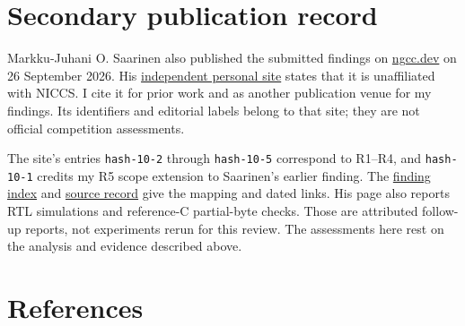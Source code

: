 \documentclass[
  english,
  11pt,
  a4paper,
]{article}
\begin{document}

\section{Secondary publication
record}\label{secondary-publication-record}

Markku-Juhani O. Saarinen also published the submitted findings on
\href{https://ngcc.dev/reports/hash-10.html}{ngcc.dev} on 26 September
2026. His \href{https://ngcc.dev/}{independent personal site} states
that it is unaffiliated with NICCS. I cite it for prior work and as
another publication venue for my findings. Its identifiers and editorial
labels belong to that site; they are not official competition
assessments.

The site's entries \texttt{hash-10-2} through \texttt{hash-10-5}
correspond to R1--R4, and \texttt{hash-10-1} credits my R5 scope
extension to Saarinen's earlier finding. The
\href{FINDINGS.md\#secondary-publication-record}{finding index} and
\href{data/saarinen_followup.json}{source record} give the mapping and
dated links. His page also reports RTL simulations and reference-C
partial-byte checks. Those are attributed follow-up reports, not
experiments rerun for this review. The assessments here rest on the
analysis and evidence described above.


\section{References}\label{references}
\end{document}
